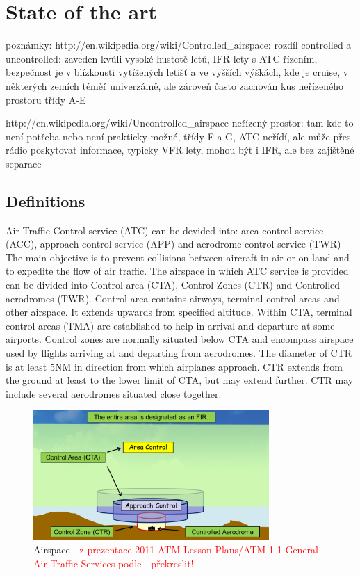 \chapter{State of the art}

poznámky:
http://en.wikipedia.org/wiki/Controlled_airspace: rozdíl controlled a uncontrolled: zaveden kvůli vysoké hustotě letů, IFR lety s ATC řízením, bezpečnost
je v blízkousti vytížených letišť a ve vyšších výškách, kde je cruise, v některých zemích téměř univerzálně, ale zároveň často zachován kus neřízeného prostoru
třídy A-E

http://en.wikipedia.org/wiki/Uncontrolled_airspace neřízený prostor: tam kde to není potřeba nebo není prakticky možné, třídy F a G, ATC neřídí, ale může přes rádio poskytovat informace, typicky VFR lety, mohou být i IFR, ale bez zajištěné separace

\section{Definitions}

Air Traffic Control service (ATC) can be devided into: area control service (ACC), approach control service (APP) and aerodrome control service (TWR) \cite[Chapter 1]{doc4444} The main objective is to prevent collisions between aircraft in air or on land and to expedite the flow of air traffic. \cite[Chapter 2.2]{annex11}
The airspace in which ATC service is provided can be divided into Control area (CTA), Control Zones (CTR) and Controlled aerodromes (TWR). Control area contains airways, terminal control areas and other airspace. It extends upwards from specified altitude. Within CTA, terminal control areas (TMA) are established to help in arrival and departure at some airports.
Control zones are normally situated below CTA and encompass airspace used by flights arriving at and departing from aerodromes. The diameter of CTR is at least 5NM in direction from which airplanes approach. CTR extends from the ground at least to the lower limit of CTA, but may extend further. CTR may include several aerodromes situated close together. \cite[Chapter 2.10]{annex11}

\begin{figure}[h]
    \centering
    \includegraphics[width=0.8\textwidth]{figures/airspace.png}
    \caption{Airspace - \textcolor{red}{z prezentace 2011 ATM Lesson Plans/ATM 1-1 General Air Traffic Services podle \cite[Chapter 2.5]{annex11} - překreslit!}}
    \label{fig:airspace}
\end{figure}

